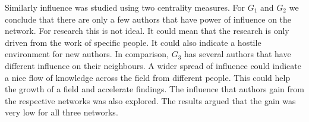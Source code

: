 \documentclass{article}
\theoremstyle{definition}
\begin{document}
Similarly influence was studied using two centrality measures. For \(G_1\) and
\(G_2\) we conclude that there are only a few authors that have power of influence
on the network. For research this is not ideal. It could mean that the research
is only driven from the work of specific people. It could also indicate a hostile
environment for new authors. In comparison, \(G_3\) has several authors that have
different influence on their neighbours. A wider spread of influence could indicate
a nice flow of knowledge across the field from different people. This could
help the growth of a field and accelerate findings. The influence that authors
gain from the respective networks was also explored. The results argued that
the gain was very low for all three networks.



\newpage


\end{document}
